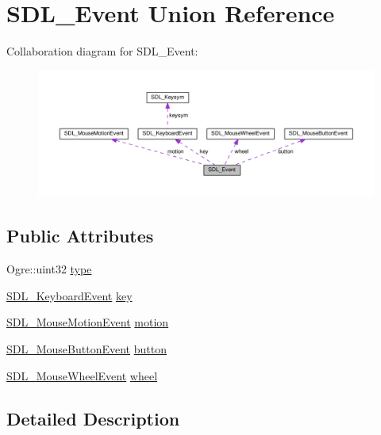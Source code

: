 \hypertarget{union_s_d_l___event}{}\section{S\+D\+L\+\_\+\+Event Union Reference}
\label{union_s_d_l___event}


Collaboration diagram for S\+D\+L\+\_\+\+Event\+:\nopagebreak
\begin{figure}[H]
\begin{center}
\leavevmode
\includegraphics[width=350pt]{union_s_d_l___event__coll__graph}
\end{center}
\end{figure}
\subsection*{Public Attributes}
\begin{DoxyCompactItemize}
\item 
Ogre\+::uint32 \hyperlink{union_s_d_l___event_a8edda577bed999c1c67fec65746637fa}{type}
\item 
\hyperlink{struct_s_d_l___keyboard_event}{S\+D\+L\+\_\+\+Keyboard\+Event} \hyperlink{union_s_d_l___event_ab99927835cc77a9b6bb50b419b4a27df}{key}
\item 
\hyperlink{struct_s_d_l___mouse_motion_event}{S\+D\+L\+\_\+\+Mouse\+Motion\+Event} \hyperlink{union_s_d_l___event_ac3c89e190faacbe84280cd539453bab6}{motion}
\item 
\hyperlink{struct_s_d_l___mouse_button_event}{S\+D\+L\+\_\+\+Mouse\+Button\+Event} \hyperlink{union_s_d_l___event_ab6da2fa2687e5f849f270adecc64785f}{button}
\item 
\hyperlink{struct_s_d_l___mouse_wheel_event}{S\+D\+L\+\_\+\+Mouse\+Wheel\+Event} \hyperlink{union_s_d_l___event_a267d3f550715519ec90a81ccd0e6cbda}{wheel}
\end{DoxyCompactItemize}


\subsection{Detailed Description}



